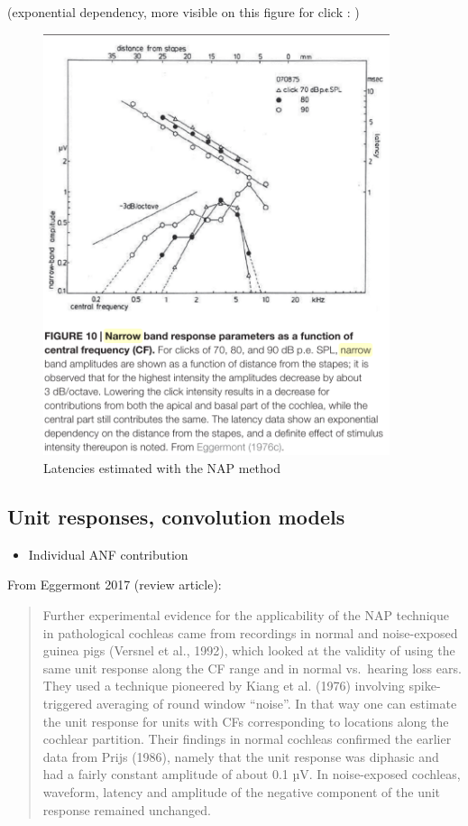 \documentclass[]{article}
\providecommand{\tightlist}{%
  \setlength{\itemsep}{0pt}\setlength{\parskip}{0pt}}
\begin{document}
(exponential dependency, more visible on this figure for click : )

\begin{figure}
\centering
\includegraphics[width=4in,height=\textheight]{./figures/NAP_click_latencies.png}
\caption{Latencies estimated with the NAP method}
\end{figure}

\clearpage

\hypertarget{unit-responses-convolution-models}{%
\subsection{Unit responses, convolution
models}\label{unit-responses-convolution-models}}

\begin{itemize}
\tightlist
\item
  Individual ANF contribution
\end{itemize}

From Eggermont 2017 (review article):

\begin{quote}
Further experimental evidence for the applicability of the NAP technique
in pathological cochleas came from recordings in normal and
noise-exposed guinea pigs (Versnel et al., 1992), which looked at the
validity of using the same unit response along the CF range and in
normal vs.~hearing loss ears. They used a technique pioneered by Kiang
et al. (1976) involving spike-triggered averaging of round window
``noise''. In that way one can estimate the unit response for units with
CFs corresponding to locations along the cochlear partition. Their
findings in normal cochleas confirmed the earlier data from Prijs
(1986), namely that the unit response was diphasic and had a fairly
constant amplitude of about 0.1 µV. In noise-exposed cochleas, waveform,
latency and amplitude of the negative component of the unit response
remained unchanged.
\end{quote}
\end{document}
